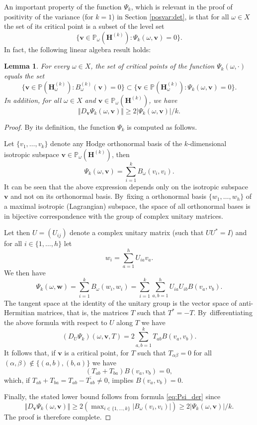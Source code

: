 \documentclass[JEP,XML,SOM,Unicode,published]{cedram}
\let\sep:
\theoremstyle{plain}
\newtheorem{lemma}[thm]{Lemma}
\theoremstyle{definition}
\numberwithin{equation}{subsection}
\newcommand\bP{\mathbb{P}}
\newcommand{\bfH}{\boldsymbol{H}}
\newcommand{\bfv}{\boldsymbol{v}}
\newcommand{\bfw}{\boldsymbol{w}}
\begin{document}
An important property of the function $\Psi_k$, which is relevant in the proof of \hbox{positivity} of the variance (for $k=1$)
in Section \ref{posvar:det}, is that for all $\omega \in X$ the set of its critical point is a subset of the level set
\[
\{\bfv \in \bP_\omega(\bfH^{(k)}) \sep \Psi_k(\omega, \bfv)=0\}.
\]
In fact, the following linear algebra result holds:
\begin{lemma}
\label{lemma:crit}
For every $\omega \in X$, the set of critical points of the function $\Psi_k(\omega, \cdot)$ equals the set
\[
\{ \bfv \in \bP(\bfH_\omega^{(k)}) \sep B^{(k)}_\omega(\bfv)=0\} \subset \{\bfv \in \bP(\bfH_\omega^{(k)}) \sep \Psi_k(\omega, \bfv)=0\}.
\]
In addition, for all $\omega \in X$ and
$\bfv \in \bP_\omega (\bfH^{(k)})$, we have
\[
\Vert D_{ \bfv }\Psi_k(\omega, \bfv) \Vert\geq 2 \vert \Psi_k(\omega, \bfv)\vert/k.
\]
\end{lemma}
\begin{proof}
By its definition, the function $\Psi_k$ is computed as follows.

Let $\{v_1, \dots, v_k\}$ denote any Hodge orthonormal
basis of the $k$-dimensional isotropic subspace $\bfv \in \bP_\omega(\bfH^{(k)}) $, then
\[
\Psi_k(\omega, \bfv) = \sum_{i=1}^k B_\omega(v_i, v_i).
\]
It can be seen that the above expression depends only on the isotropic subspace $\bfv$ and not on its orthonormal basis. By~fixing a orthonormal basis $\{w_1, \dots, w_h\}$
of a maximal isotropic (Lagrangian) subspace, the space of all orthonormal bases is in bijective correspondence with the group
of complex unitary matrices.

Let then $U =(U_{ij})$ denote a complex unitary matrix (such that $UU^*=I$) and for all $i\in \{1, \dots, h\}$ let
\[
w_i = \sum_{a=1}^h U_{ia} v_a.
\]
We then have
\[
\Psi_k(\omega, \bfw) =
\sum_{i=1}^k B_\omega(w_i, w_i) = \sum_{i=1}^k
\sum_{a,b=1}^h U_{ia} U_{ib} B(v_a, v_b).
\]
The tangent space at the identity of the unitary group is the vector space of anti-Hermitian matrices, that is, the matrices
$T$ such that $T^* = -T$. By~differentiating the above formula
with respect to $U$ along $T$ we have
\begin{equation}
\label{eq:Psi_der}
(D_U\Psi_k)(\omega, \bfv, T)= 2
\sum_{a,b=1}^k T_{ab} B(v_a, v_b).
\end{equation}
It follows that, if $\bfv$ is a critical point,
for $T$ such that $T_{\alpha\beta}=0$ for all $(\alpha,\beta) \not\in \{(a,b), (b,a)\}$ we have
\[
(T_{ab} + T_{ba}) B(v_a, v_b) =0,
\]
which, if $T_{ab} + T_{ba}= T_{ab} - \overline{T_{ab}}\not=0$,
implies $B(v_a, v_b)=0$.

Finally, the stated lower bound follows
from formula \eqref{eq:Psi_der} since
\[
\Vert D_{ \bfv }\Psi_k(\omega, \bfv) \Vert\geq 2 (\max\nolimits_{i\in \{1, \dots, k\}} \vert B_\omega(v_i,v_i)\vert) \geq 2 \vert \Psi_k (\omega, \bfv) \vert /k.
\]
The proof is therefore complete.
\end{proof}
\end{document}
